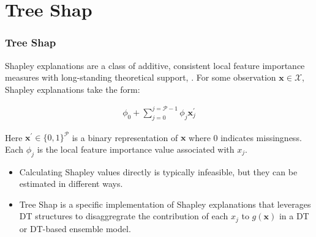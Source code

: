 \documentclass[11pt,
               aspectratio=169
               ]{beamer}
\begin{document}
	\section{Tree Shap}

		\begin{frame}[t]
		
			\frametitle{Tree Shap}
		
			Shapley explanations are a class of additive, consistent local feature importance measures with long-standing theoretical support, \cite{shapley}. For some observation $\mathbf{x} \in \mathcal{X}$, Shapley explanations take the form:
			
			\vspace{-5pt}
			
			\begin{equation*}
				\begin{aligned}
					\phi_0 + \sum_{j=0}^{j=\mathcal{P} - 1} \phi_j \mathbf{x}_j^\prime
				\end{aligned}
			\end{equation*}
			
			Here $\mathbf{x}^\prime \in \{0,1\}^\mathcal{P}$ is a binary representation of $\mathbf{x}$ where 0 indicates missingness. Each $\phi_j$ is the local feature importance value associated with $x_j$.
			
			\begin{itemize}
			
				\item Calculating Shapley values directly is typically infeasible, but they can be estimated in different ways.
			
				\item Tree Shap is a specific implementation of Shapley explanations that leverages DT structures to disaggregrate the contribution of each $x_j$ to $g(\mathbf{x})$ in a DT or DT-based ensemble model. \cite{tree_shap}
				
			\end{itemize}
			
		\end{frame}
	
\end{document}
